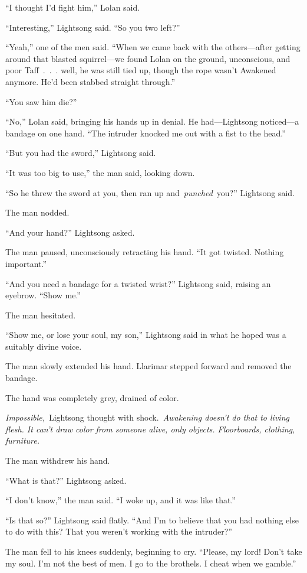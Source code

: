 “I thought I’d fight him,” Lolan said.

“Interesting,” Lightsong said. “So you two left?”

“Yeah,” one of the men said. “When we came back with the others—after getting around that blasted squirrel—we found Lolan on the ground, unconscious, and poor Taff~.~.~. well, he was still tied up, though the rope wasn’t Awakened anymore. He’d been stabbed straight through.”

“You saw him die?”

“No,” Lolan said, bringing his hands up in denial. He had—Lightsong noticed—a bandage on one hand. “The intruder knocked me out with a fist to the head.”

“But you had the sword,” Lightsong said.

“It was too big to use,” the man said, looking down.

“So he threw the sword at you, then ran up and~\textit{punched}~you?” Lightsong said.

The man nodded.

“And your hand?” Lightsong asked.

The man paused, unconsciously retracting his hand. “It got twisted. Nothing important.”

“And you need a bandage for a twisted wrist?” Lightsong said, raising an eyebrow. “Show me.”

The man hesitated.

“Show me, or lose your soul, my son,” Lightsong said in what he hoped was a suitably divine voice.

The man slowly extended his hand. Llarimar stepped forward and removed the bandage.

The hand was completely grey, drained of color.

\textit{Impossible,}~Lightsong thought with shock.~\textit{Awakening doesn’t do that to living flesh. It can’t draw color from someone alive, only objects. Floorboards, clothing, furniture.}

The man withdrew his hand.

“What is that?” Lightsong asked.

“I don’t know,” the man said. “I woke up, and it was like that.”

“Is that so?” Lightsong said flatly. “And I’m to believe that you had nothing else to do with this? That you weren’t working with the intruder?”

The man fell to his knees suddenly, beginning to cry. “Please, my lord! Don’t take my soul. I’m not the best of men. I go to the brothels. I cheat when we gamble.”

